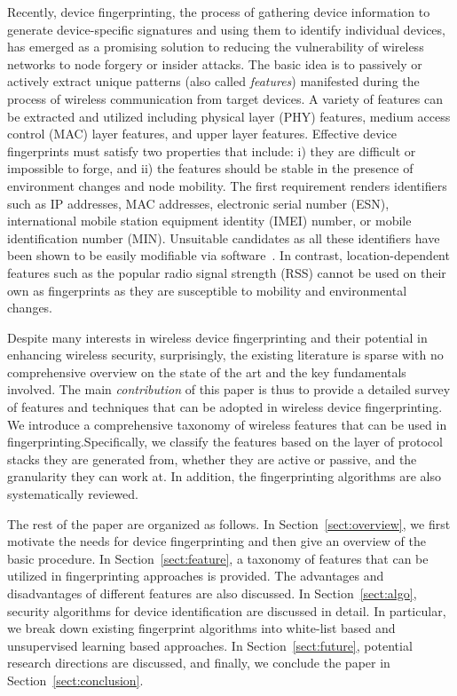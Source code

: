 \documentclass[journal,draftcls,onecolumn,11pt]{IEEEtran}
\newcounter{ctr}\setcounter{ctr}{0}
\begin{document}
Recently, device fingerprinting, the process of gathering device information to generate device-specific signatures and using them to identify individual devices, has emerged as a promising solution to reducing the vulnerability of wireless networks to node forgery or insider attacks\cite{Bratus2008,Brik2008,Chen,Desmond2008,Franklin,Gao,Hall2005,Nguyen2011,Scanlon2010,Ureten2007,Neumann}. The basic idea is to passively or actively extract unique patterns (also called {\it features}) manifested during the process of wireless communication from target devices. A variety of features can be extracted and utilized including physical layer (PHY) features, medium access control (MAC) layer features, and upper layer features.  Effective device fingerprints must satisfy two properties that include: i) they are difficult or impossible to forge, and ii) the features should be stable in the presence of environment changes and node mobility. The first requirement renders identifiers such as IP addresses, MAC addresses, electronic serial number (ESN), international mobile station equipment identity (IMEI) number, or mobile identification number (MIN). Unsuitable candidates as all these identifiers have been shown to be easily modifiable via software~\cite{douceur2002sybil,yang2008detecting}. In contrast, location-dependent features such as the popular radio signal strength (RSS) cannot be used on their own as fingerprints as they are susceptible to mobility and environmental changes.

Despite many interests in wireless device fingerprinting and their potential in enhancing wireless security, surprisingly, the existing literature is sparse with no comprehensive overview on the state of the art and the key fundamentals involved. The main \emph{contribution} of this paper is thus to provide a detailed survey of features and techniques that can be adopted in wireless device fingerprinting. We introduce a comprehensive taxonomy of wireless features that can be used in fingerprinting.Specifically, we classify the features based on the layer of protocol stacks they are generated from, whether they are active or passive, and the granularity they can work at. In addition, the fingerprinting algorithms are also systematically reviewed.

The rest of the paper are organized as follows. In Section~\ref{sect:overview}, we first motivate the needs for device fingerprinting and then give an overview of the basic procedure. In Section~\ref{sect:feature}, a taxonomy of features that can be utilized in fingerprinting approaches is provided.  The advantages and disadvantages of different features are also discussed. In Section~\ref{sect:algo}, security algorithms for device identification are discussed in detail. In particular, we break down existing fingerprint algorithms into white-list based and unsupervised learning based approaches. In Section~\ref{sect:future}, potential research directions are discussed, and finally, we conclude the paper in Section~\ref{sect:conclusion}.
\end{document}
